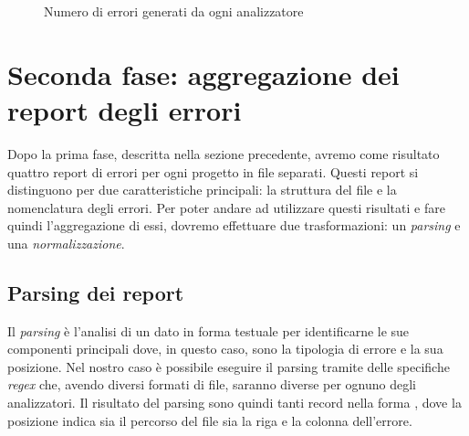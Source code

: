     \begin{figure}
      \centering
      \caption{Numero di errori generati da ogni analizzatore}
      \label{fig:grafo_errori_generati}
  \end{figure}


\section{Seconda fase: aggregazione dei report degli errori}
Dopo la prima fase, descritta nella sezione precedente, avremo come risultato quattro report di errori per ogni progetto in file separati. Questi report si distinguono per due caratteristiche principali: la struttura del file e la nomenclatura degli errori. 
Per poter andare ad utilizzare questi risultati e fare quindi l'aggregazione di essi, dovremo effettuare due trasformazioni: un \textit{parsing} e una \textit{normalizzazione}.


\subsection{Parsing dei report}
Il \textit{parsing} è l'analisi di un dato in forma testuale per identificarne le sue componenti principali dove, in questo caso, sono la tipologia di errore e la sua posizione. 
Nel nostro caso è possibile eseguire il parsing tramite delle specifiche \textit{regex} che, avendo diversi formati di file, saranno diverse per ognuno degli analizzatori.
Il risultato del parsing sono quindi tanti record nella forma , dove la posizione indica sia il percorso del file sia la riga e la colonna dell'errore.

